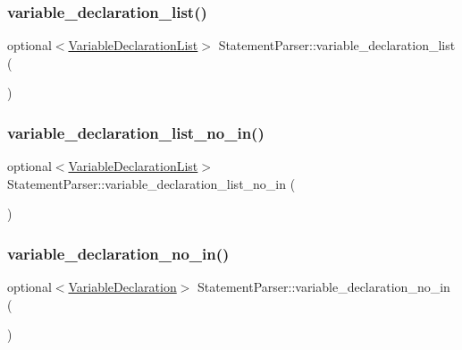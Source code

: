 \subsubsection{\texorpdfstring{variable\+\_\+declaration\+\_\+list()}{variable\_declaration\_list()}}
{\footnotesize\ttfamily optional$<$\hyperlink{ast_8h_aec22eb11f4589548d456f7ffdb23ccdf}{Variable\+Declaration\+List}$>$ Statement\+Parser\+::variable\+\_\+declaration\+\_\+list (\begin{DoxyParamCaption}{ }\end{DoxyParamCaption})\hspace{0.3cm}{\ttfamily [inline]}}

\mbox{\label{class_statement_parser_a437b1ab062ec19fc781f591113ec6e97}} 
\subsubsection{\texorpdfstring{variable\+\_\+declaration\+\_\+list\+\_\+no\+\_\+in()}{variable\_declaration\_list\_no\_in()}}
{\footnotesize\ttfamily optional$<$\hyperlink{ast_8h_aec22eb11f4589548d456f7ffdb23ccdf}{Variable\+Declaration\+List}$>$ Statement\+Parser\+::variable\+\_\+declaration\+\_\+list\+\_\+no\+\_\+in (\begin{DoxyParamCaption}{ }\end{DoxyParamCaption})\hspace{0.3cm}{\ttfamily [inline]}}

\mbox{\label{class_statement_parser_ae0ab03114ed82f3d3eedbc8a0271ce33}} 
\subsubsection{\texorpdfstring{variable\+\_\+declaration\+\_\+no\+\_\+in()}{variable\_declaration\_no\_in()}}
{\footnotesize\ttfamily optional$<$\hyperlink{struct_variable_declaration}{Variable\+Declaration}$>$ Statement\+Parser\+::variable\+\_\+declaration\+\_\+no\+\_\+in (\begin{DoxyParamCaption}{ }\end{DoxyParamCaption})\hspace{0.3cm}{\ttfamily [inline]}}

